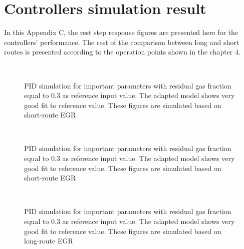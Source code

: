 \chapter{Controllers simulation result}\label{cha:Controllers_result}
In this Appendix C, the rest step response figures are presented here for the controllers' performance. The rest of the comparison between long and short routes is presented according to the operation points shown in the chapter 4. 

\begin{figure}[tbp]
  \centering
  \qquad
  \\
  \caption{\label{fig:PID_2000_100_3000_50}%
  PID simulation for important parameters with residual gas fraction equal to 0.3 as reference input value. The adapted model shows very good fit to reference value. These figures are simulated based on short-route EGR}
\end{figure}

\begin{figure}[tbp]
  \centering
  \qquad
  \\
  \caption{\label{fig:PID_4000_50_4000_100}%
  PID simulation for important parameters with residual gas fraction equal to 0.3 as reference input value. The adapted model shows very good fit to reference value. These figures are simulated based on short-route EGR}
\end{figure}
 
\begin{figure}[tbp]
  \centering
  \qquad
  \\
  \caption{\label{fig:PID_2000_100_3000_50_2}%
  PID simulation for important parameters with residual gas fraction equal to 0.3 as reference input value. The adapted model shows very good fit to reference value. These figures are simulated based on long-route EGR}
\end{figure}

